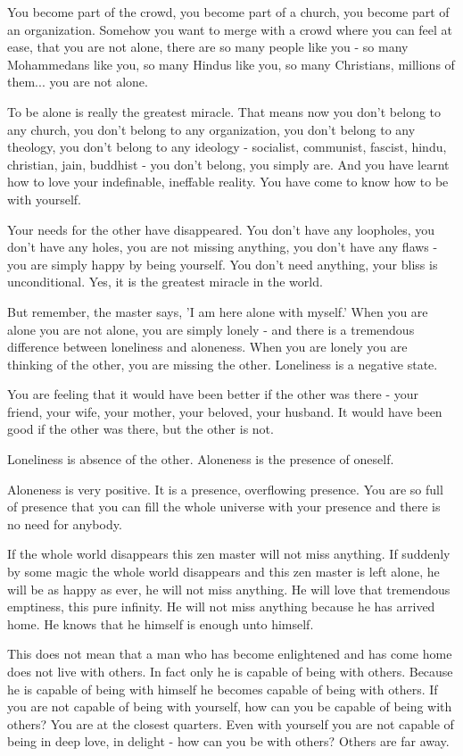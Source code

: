 You become part of the crowd, you become part of a church, you become part of an organization. Somehow you want to merge with a crowd where you can feel at ease, that you are not alone, there are so many people like you - so many Mohammedans like you, so many Hindus like you, so many Christians, millions of them... you are not alone.

To be alone is really the greatest miracle. That means now you don't belong to any church, you don't belong to any organization, you don't belong to any theology, you don't belong to any ideology - socialist, communist, fascist, hindu, christian, jain, buddhist - you don't belong, you simply are. And you have learnt how to love your indefinable, ineffable reality. You have come to know how to be with yourself.

Your needs for the other have disappeared. You don't have any loopholes, you don't have any holes, you are not missing anything, you don't have any flaws - you are simply happy by being yourself. You don't need anything, your bliss is unconditional. Yes, it is the greatest miracle in the world.

But remember, the master says, 'I am here alone with myself.' When you are alone you are not alone, you are simply lonely - and there is a tremendous difference between loneliness and aloneness. When you are lonely you are thinking of the other, you are missing the other. Loneliness is a negative state.

You are feeling that it would have been better if the other was there - your friend, your wife, your mother, your beloved, your husband. It would have been good if the other was there, but the other is not.

Loneliness is absence of the other. Aloneness is the presence of oneself.

Aloneness is very positive. It is a presence, overflowing presence. You are so full of presence that you can fill the whole universe with your presence and there is no need for anybody.

If the whole world disappears this zen master will not miss anything. If suddenly by some magic the whole world disappears and this zen master is left alone, he will be as happy as ever, he will not miss anything. He will love that tremendous emptiness, this pure infinity. He will not miss anything because he has arrived home. He knows that he himself is enough unto himself.

This does not mean that a man who has become enlightened and has come home does not live with others. In fact only he is capable of being with others. Because he is capable of being with himself he becomes capable of being with others. If you are not capable of being with yourself, how can you be capable of being with others? You are at the closest quarters. Even with yourself you are not capable of being in deep love, in delight - how can you be with others? Others are far away.

